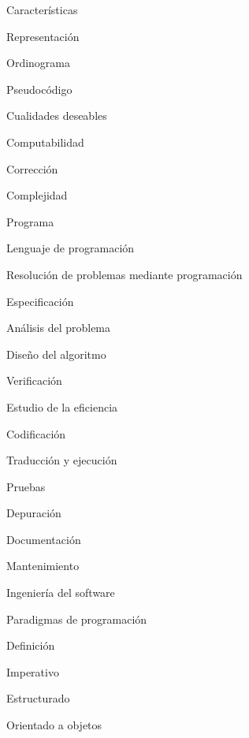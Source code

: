 \begin{longenum}
\begin{longenum}
\begin{longenum}
\begin{longenum}
                \item Características
                \item Representación
                \begin{longenum}
                    \item Ordinograma
                    \item Pseudocódigo
                \end{longenum}
                \item Cualidades deseables
                \item Computabilidad
                \item Corrección
                \item Complejidad
            \end{longenum}
            \item Programa
            \item Lenguaje de programación
        \end{longenum}
        \item Resolución de problemas mediante programación
        \begin{longenum}
            \item Especificación
            \item Análisis del problema
            \item Diseño del algoritmo
            \item Verificación
            \item Estudio de la eficiencia
            \item Codificación
            \item Traducción y ejecución
            \item Pruebas
            \item Depuración
            \item Documentación
            \item Mantenimiento
            \item Ingeniería del software
        \end{longenum}
        \item Paradigmas de programación
        \begin{longenum}
            \item Definición
            \item Imperativo
            \begin{longenum}
                \item Estructurado
                \item Orientado a objetos

\end{longenum}
\end{longenum}
\end{longenum}
\end{longenum}
